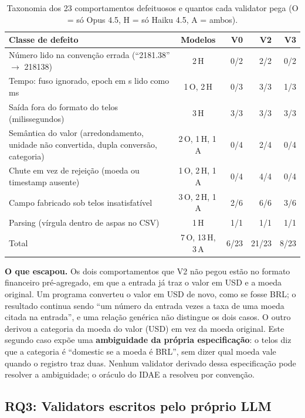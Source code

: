 \documentclass[sigconf,nonacm]{acmart}
\begin{document}
\begin{table}[t]
\caption{Taxonomia dos 23 comportamentos defeituosos e quantos cada validator pega (O = só Opus 4.5, H = só Haiku 4.5, A = ambos).}
\label{tab:taxonomia}
\small
\begin{tabular}{p{3.4cm}crrr}
\toprule
Classe de defeito & Modelos & V0 & V2 & V3 \\
\midrule
Número lido na convenção errada (``2181.38'' $\to$ 218138) & 2\,H & 0/2 & 2/2 & 0/2 \\
Tempo: fuso ignorado, epoch em s lido como ms & 1\,O, 2\,H & 0/3 & 3/3 & 1/3 \\
Saída fora do formato do telos (milissegundos) & 3\,H & 3/3 & 3/3 & 3/3 \\
Semântica do valor (arredondamento, unidade não convertida, dupla conversão, categoria) & 2\,O, 1\,H, 1\,A & 0/4 & 2/4 & 0/4 \\
Chute em vez de rejeição (moeda ou timestamp ausente) & 1\,O, 2\,H, 1\,A & 0/4 & 4/4 & 0/4 \\
Campo fabricado sob telos insatisfatível & 3\,O, 2\,H, 1\,A & 2/6 & 6/6 & 3/6 \\
Parsing (vírgula dentro de aspas no CSV) & 1\,H & 1/1 & 1/1 & 1/1 \\
\midrule
Total & 7\,O, 13\,H, 3\,A & 6/23 & 21/23 & 8/23 \\
\bottomrule
\end{tabular}
\end{table}

\textbf{O que escapou.} Os dois comportamentos que V2 não pegou estão no formato financeiro pré-agregado, em que a entrada já traz o valor em USD e a moeda original. Um programa converteu o valor em USD de novo, como se fosse BRL; o resultado continua sendo ``um número da entrada vezes a taxa de uma moeda citada na entrada'', e uma relação genérica não distingue os dois casos. O outro derivou a categoria da moeda do valor (USD) em vez da moeda original. Este segundo caso expõe uma \textbf{ambiguidade da própria especificação}: o telos diz que a categoria é ``domestic se a moeda é BRL'', sem dizer qual moeda vale quando o registro traz duas. Nenhum validator derivado dessa especificação pode resolver a ambiguidade; o oráculo do IDAE a resolveu por convenção.

\subsection{RQ3: Validators escritos pelo próprio LLM}
\label{sec:rq3}
\end{document}
